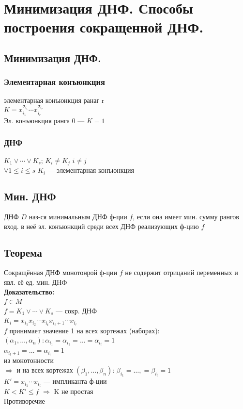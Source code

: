 \documentclass[12pt]{article}
\begin{document}
\section{Минимизация ДНФ. Способы построения сокращенной ДНФ.}
\subsection{Минимизация ДНФ.}
\subsubsection{Элементарная конъюнкция}
	элементарная конъюнкция ранаг r\\
	$K = x_{i_1}^{\sigma_{i_1}} \dotsb x_{i_r}^{\sigma_{i_r}}$\\
	Эл. конъюнкция ранга $0$ 	— $K = 1$ 
\subsubsection{ДНФ}
	$K_1 \vee \dotsb \vee K_s$; $K_i \neq K_j$ $i \neq j$\\
	$\forall 1 \leqslant i \leqslant s$ $K_i$ — элементарная конъюнкция
\subsection{Мин. ДНФ}
	ДНФ $D$ наз-ся минимальным ДНФ ф-ции $f$, если она имеет мин. сумму рангов вход. в неё эл. конъюнкций среди всех ДНФ реализующих ф-цию $f$
\subsection{Теорема}
	Сокращённая ДНФ монотонрой ф-ции $f$ не содержит отрицаний переменных и явл. её ед. мин. ДНФ\\
	\textbf{Доказательство:}\\
		$f \in M$\\
		$f = K_1 \vee \dotsb \vee K_s$ — сокр. ДНФ\\
		$K_i = x_{i_1}x_{i_2}\dotsm x_{i_t}\overline{x_{i_t + 1}}\dotsm \overline{x_{i_r}}$\\
		$f$ принимает значение 1 на всех кортежах (наборах):
		$(\alpha_1,\dotsc,\alpha_n): \alpha_{i_1} = \alpha_{i_2} = \dotsc = \alpha_{i_t} = 1$\\
		$\alpha_{i_t + 1} = \dotsc = \alpha_{i_r} = 1$\\
		из монотонности\\
		$\Rightarrow$ и на всех кортежах $(\beta_1,\dotsc,\beta_n)$: $\beta_{i_1} = \dotsc, = \beta_{i_t} = 1$\\
		$K' = x_{i_1}\dotsm x_{i_t}$ — импликанта ф-ции\\
		$K < K' \leqslant f$ $\Rightarrow$ K не простая\\
		Противоречие\\
	\qedsymbol
\end{document}
